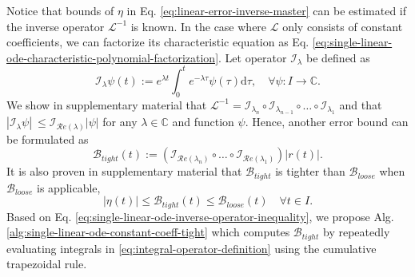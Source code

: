 \documentclass[accepted]{uai2023}
\newcommand{\Err}{\eta}
\newcommand{\Bound}{\mathcal{B}}
\renewcommand{\L}{\mathcal{L}}
\newcommand{\I}{\mathcal{I}}
\renewcommand{\Re}[1]{\mathcal{R}e\left(#1\right)}
\begin{document}
    Notice that bounds of $\Err$ in Eq. \ref{eq:linear-error-inverse-master} can be estimated if the inverse operator $\L^{-1}$ is known. 
    In the case where $\L$ only consists of constant coefficients, we can factorize its characteristic equation as Eq. \ref{eq:single-linear-ode-characteristic-polynomial-factorization}.
    Let operator $\I_{\lambda}$ be defined as 
    \begin{equation} \label{eq:integral-operator-definition}
        \I_\lambda \psi(t) := e^{{\lambda} t} \int_{0}^{t} e^{-{\lambda} \tau} \psi(\tau) \mathrm{d}\tau, \quad \forall \psi : I \to \mathbb{C}.
    \end{equation}
    We show in supplementary material that $\L^{-1} = \I_{\lambda_{n}} \circ \I_{\lambda_{n-1}} \circ \dots \circ \I_{\lambda_1}$ and that $\left|\I_{\lambda} \psi\right| \ \leq \I_{\Re{\lambda}} |\psi|$ for any $\lambda \in \mathbb{C}$ and function $\psi$.
    Hence, another error bound can be formulated as
    \begin{equation} \label{eq:single-linear-ode-inverse-operator-inequality}
        \Bound_{tight}(t) := \left(\I_{\Re{\lambda_{n}}} \circ \dots \circ \I_{\Re{\lambda_1}}\right) |r(t)|.
    \end{equation}
    It is also proven in supplementary material that $\Bound_{tight}$ is tighter than $\Bound_{loose}$ when $\Bound_{loose}$ is applicable,
    \begin{equation} \label{eq:single-linear-ode-tight-and-loose}
        \left|\Err(t)\right| \leq \Bound_{tight}(t) \leq \Bound_{loose}(t) \quad \forall t \in I.
    \end{equation}
    Based on Eq. \ref{eq:single-linear-ode-inverse-operator-inequality}, we propose Alg. \ref{alg:single-linear-ode-constant-coeff-tight} which computes $\Bound_{tight}$ by repeatedly evaluating integrals in \ref{eq:integral-operator-definition} using the cumulative trapezoidal rule.
\end{document}
